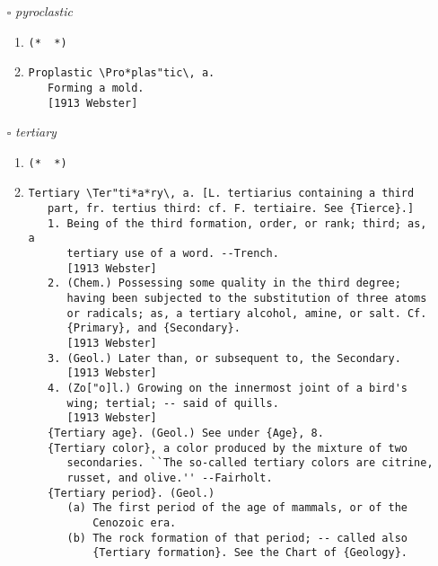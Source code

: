 \documentclass{article}
\begin{document}
\begin{itemize}
\begin{enumerate}
{\begin{lstlisting}
   word.]
   To boil gently, or with a gentle hissing; to begin to boil.
   [1913 Webster]
         I simmer as liquor doth on the fire before it beginneth
         to boil.                                 --Palsgrave.
   [1913 Webster]
Simmer \Sim"mer\, v. t.
   To cause to boil gently; to cook in liquid heated almost or
   just to the boiling point.
   [1913 Webster]
\end{lstlisting}}
\end{enumerate}
\item[$\square$] \emph{ pyroclastic }
\begin{enumerate}
\item{
\begin{lstlisting}
(*  *)
\end{lstlisting}}
\item{
\begin{lstlisting}
Proplastic \Pro*plas"tic\, a.
   Forming a mold.
   [1913 Webster]
\end{lstlisting}}
\end{enumerate}
\item[$\square$] \emph{ tertiary }
\begin{enumerate}
\item{
\begin{lstlisting}
(*  *)
\end{lstlisting}}
\item{
\begin{lstlisting}
Tertiary \Ter"ti*a*ry\, a. [L. tertiarius containing a third
   part, fr. tertius third: cf. F. tertiaire. See {Tierce}.]
   1. Being of the third formation, order, or rank; third; as, a
      tertiary use of a word. --Trench.
      [1913 Webster]
   2. (Chem.) Possessing some quality in the third degree;
      having been subjected to the substitution of three atoms
      or radicals; as, a tertiary alcohol, amine, or salt. Cf.
      {Primary}, and {Secondary}.
      [1913 Webster]
   3. (Geol.) Later than, or subsequent to, the Secondary.
      [1913 Webster]
   4. (Zo["o]l.) Growing on the innermost joint of a bird's
      wing; tertial; -- said of quills.
      [1913 Webster]
   {Tertiary age}. (Geol.) See under {Age}, 8.
   {Tertiary color}, a color produced by the mixture of two
      secondaries. ``The so-called tertiary colors are citrine,
      russet, and olive.'' --Fairholt.
   {Tertiary period}. (Geol.)
      (a) The first period of the age of mammals, or of the
          Cenozoic era.
      (b) The rock formation of that period; -- called also
          {Tertiary formation}. See the Chart of {Geology}.

\end{lstlisting}}
\end{enumerate}
\end{itemize}
\end{document}
